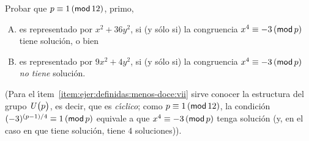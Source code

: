 \begin{ejerDefinidas}
\begin{enumerate}[(i)]
			Probar que $p\equiv 1\tmodulo[12]$, primo,
			\begin{enumerate}[(A)]
				\item es representado por $x^2+36y^2$,
					si (y s\'olo si) la congruencia
					$x^4\equiv -3\tmodulo[p]$ tiene
					soluci\'on, o bien
				\item es representado por $9x^2+4y^2$,
					si (y s\'olo si) la congruencia
					$x^4\equiv -3\tmodulo[p]$
					\emph{no tiene} soluci\'on.
			\end{enumerate}
	\end{enumerate}
	(Para el \'{\i}tem~\eqref{item:ejer:definidas:menos-doce:vii}
	sirve conocer la estructura del grupo $\Unidadesmod[p]$,
	es decir, que es \emph{c\'{\i}clico}; como $p\equiv 1\tmodulo[12]$,
	la condici\'on $(-3)^{(p-1)/4}\equiv 1\tmodulo[p]$ equivale a
	que $x^4\equiv -3\tmodulo[p]$ tenga soluci\'on (y, en el caso en que
	tiene soluci\'on, tiene $4$ soluciones)).
\end{ejerDefinidas}


